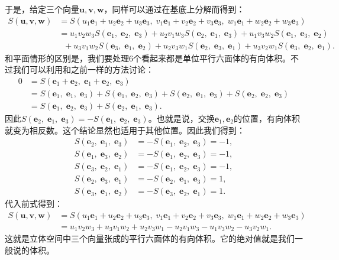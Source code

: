 \documentclass[12pt,UTF8]{ctexbook}
\begin{document}
于是，给定三个向量$\mathbf{u}, \mathbf{v},\mathbf{w}$，同样可以通过在基底上分解而得到：
\begin{align*}
    S(\mathbf{u}, \mathbf{v},\mathbf{w}) &= S(u_1\mathbf{e}_1 + u_2\mathbf{e}_2+u_3\mathbf{e}_3, \; v_1\mathbf{e}_1 + v_2 \mathbf{e}_2+v_3\mathbf{e}_3, \;w_1\mathbf{e}_1 + w_2\mathbf{e}_2 + w_3\mathbf{e}_3) \\
    &= u_1v_2w_3 S(\mathbf{e}_1, \;\mathbf{e}_2, \;\mathbf{e}_3) + u_2v_1w_3 S(\mathbf{e}_2, \;\mathbf{e}_1,\;\mathbf{e}_3)+ u_1v_3w_2 S(\mathbf{e}_1, \;\mathbf{e}_3, \;\mathbf{e}_2) \\
    &\;\; + u_3v_1w_2 S(\mathbf{e}_3, \;\mathbf{e}_1,\;\mathbf{e}_2) + u_2v_3w_1 S(\mathbf{e}_2, \;\mathbf{e}_3, \;\mathbf{e}_1) + u_3v_2w_1 S(\mathbf{e}_3, \;\mathbf{e}_2,\;\mathbf{e}_1) .
\end{align*}
和平面情形的区别是，我们要处理$6$个看起来都是单位平行六面体的有向体积。不过我们可以利用和之前一样的方法讨论：
\begin{align*}
    0 &= S(\mathbf{e}_1 + \mathbf{e}_2, \;\mathbf{e}_1 + \mathbf{e}_2,\; \mathbf{e}_3) \\
    &= S(\mathbf{e}_1, \;\mathbf{e}_1,\; \mathbf{e}_3) + S(\mathbf{e}_1, \;\mathbf{e}_2,\; \mathbf{e}_3) + S(\mathbf{e}_2, \;\mathbf{e}_1,\; \mathbf{e}_3) + S(\mathbf{e}_2, \;\mathbf{e}_2,\; \mathbf{e}_3) \\
    &= S(\mathbf{e}_1, \;\mathbf{e}_2,\; \mathbf{e}_3) + S(\mathbf{e}_2, \;\mathbf{e}_1,\; \mathbf{e}_3).
\end{align*}
因此$S(\mathbf{e}_2, \;\mathbf{e}_1,\; \mathbf{e}_3) = -S(\mathbf{e}_1, \;\mathbf{e}_2,\; \mathbf{e}_3)$。也就是说，交换$\mathbf{e}_1,\mathbf{e}_2$的位置，有向体积就变为相反数。这个结论显然也适用于其他位置。因此我们得到：
\begin{align*}
    S(\mathbf{e}_2, \;\mathbf{e}_1,\; \mathbf{e}_3) &= -S(\mathbf{e}_1, \;\mathbf{e}_2,\; \mathbf{e}_3) = -1,\\
    S(\mathbf{e}_1, \;\mathbf{e}_3,\; \mathbf{e}_2) &= -S(\mathbf{e}_1, \;\mathbf{e}_2,\; \mathbf{e}_3) = -1,\\
    S(\mathbf{e}_3, \;\mathbf{e}_2,\; \mathbf{e}_1) &= -S(\mathbf{e}_1, \;\mathbf{e}_2,\; \mathbf{e}_3) = -1, \\
    S(\mathbf{e}_2, \;\mathbf{e}_3,\; \mathbf{e}_1) &= -S(\mathbf{e}_2, \;\mathbf{e}_1,\; \mathbf{e}_3) = 1,\\
    S(\mathbf{e}_3, \;\mathbf{e}_1,\; \mathbf{e}_2) &= -S(\mathbf{e}_3, \;\mathbf{e}_2,\; \mathbf{e}_1) = 1.
\end{align*}
代入前式得到：
\begin{align*}
    S(\mathbf{u}, \mathbf{v},\mathbf{w}) &= S(u_1\mathbf{e}_1 + u_2\mathbf{e}_2+u_3\mathbf{e}_3, \; v_1\mathbf{e}_1 + v_2 \mathbf{e}_2+v_3\mathbf{e}_3, \;w_1\mathbf{e}_1 + w_2\mathbf{e}_2 + w_3\mathbf{e}_3) \\
    &= u_1v_2w_3 + u_3v_1w_2 + u_2v_3w_1 - u_2v_1w_3 - u_1v_3w_2 - u_3v_2w_1  .
\end{align*}
这就是立体空间中三个向量张成的平行六面体的有向体积。它的绝对值就是我们一般说的体积。
\end{document}

